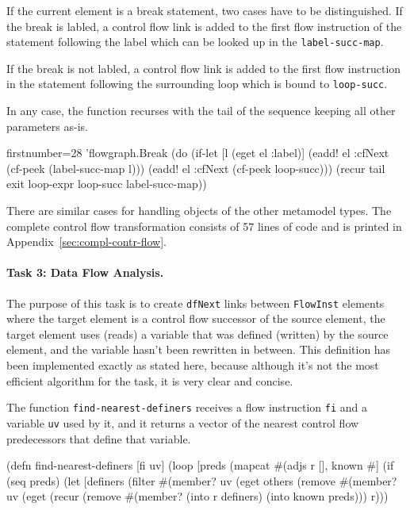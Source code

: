 \documentclass[submission]{eptcs}
\begin{document}
If the current element is a break statement, two cases have to be
distinguished.  If the break is labled, a control flow link is added to the
first flow instruction of the statement following the label which can be looked
up in the \verb|label-succ-map|.

If the break is not labled, a control flow link is added to the first flow
instruction in the statement following the surrounding loop which is bound to
\verb|loop-succ|.

In any case, the function recurses with the tail of the sequence keeping all
other parameters as-is.

\begin{clojurecode*}{firstnumber=28}
        'flowgraph.Break (do (if-let [l (eget el :label)]
                               (eadd! el :cfNext (cf-peek (label-succ-map l)))
                               (eadd! el :cfNext (cf-peek loop-succ)))
                           (recur tail exit loop-expr loop-succ label-succ-map))
\end{clojurecode*}

There are similar cases for handling objects of the other metamodel types.  The
complete control flow transformation consists of 57 lines of code and is
printed in Appendix~\ref{sec:compl-contr-flow}.


\paragraph{Task 3: Data Flow Analysis.}
\label{sec:task-3}

The purpose of this task is to create \verb|dfNext| links between
\verb|FlowInst| elements where the target element is a control flow successor
of the source element, the target element uses (reads) a variable that was
defined (written) by the source element, and the variable hasn't been rewritten
in between.  This definition has been implemented exactly as stated here,
because although it's not the most efficient algorithm for the task, it is very
clear and concise.

The function \verb|find-nearest-definers| receives a flow instruction \verb|fi|
and a variable \verb|uv| used by it, and it returns a vector of the nearest
control flow predecessors that define that variable.

\begin{clojurecode}
(defn find-nearest-definers [fi uv]
  (loop [preds (mapcat #(adjs %
         r [], known #{}]
    (if (seq preds)
      (let [definers (filter #(member? uv (eget %
            others   (remove #(member? uv (eget %
        (recur (remove #(member? %
               (into r definers) (into known preds)))
      r)))
\end{clojurecode}
\end{document}
